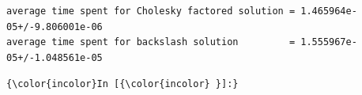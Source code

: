 \documentclass[11pt]{article}
\begin{document}
    \begin{Verbatim}[commandchars=\\\{\}]
average time spent for Cholesky factored solution = 1.465964e-05+/-9.806001e-06
average time spent for backslash solution         = 1.555967e-05+/-1.048561e-05

    \end{Verbatim}

    \begin{Verbatim}[commandchars=\\\{\}]
{\color{incolor}In [{\color{incolor} }]:} 
\end{Verbatim}


    
    
    
    
\end{document}
